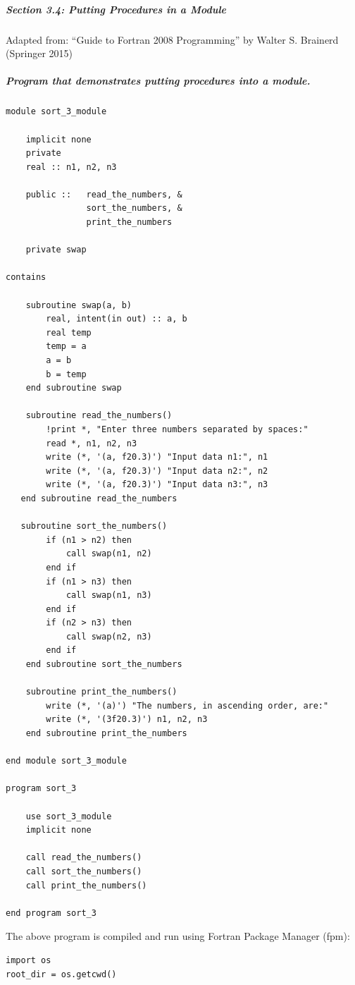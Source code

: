 \subparagraph{Section 3.4: Putting Procedures in a Module}

Adapted from: ``Guide to Fortran 2008 Programming'' by Walter S. Brainerd (Springer 2015)

\subparagraph{Program that demonstrates putting procedures into a module.}

\begin{verbatim}
module sort_3_module

    implicit none
    private
    real :: n1, n2, n3

    public ::   read_the_numbers, &
                sort_the_numbers, &
                print_the_numbers

    private swap

contains

    subroutine swap(a, b)
        real, intent(in out) :: a, b
        real temp
        temp = a
        a = b
        b = temp
    end subroutine swap

    subroutine read_the_numbers()
        !print *, "Enter three numbers separated by spaces:"
        read *, n1, n2, n3
        write (*, '(a, f20.3)') "Input data n1:", n1
        write (*, '(a, f20.3)') "Input data n2:", n2
        write (*, '(a, f20.3)') "Input data n3:", n3
   end subroutine read_the_numbers

   subroutine sort_the_numbers()
        if (n1 > n2) then
            call swap(n1, n2)
        end if
        if (n1 > n3) then
            call swap(n1, n3)
        end if
        if (n2 > n3) then
            call swap(n2, n3)
        end if
    end subroutine sort_the_numbers

    subroutine print_the_numbers()
        write (*, '(a)') "The numbers, in ascending order, are:"
        write (*, '(3f20.3)') n1, n2, n3
    end subroutine print_the_numbers

end module sort_3_module

program sort_3

    use sort_3_module
    implicit none

    call read_the_numbers()
    call sort_the_numbers()
    call print_the_numbers()

end program sort_3
\end{verbatim}

The above program is compiled and run using Fortran Package Manager (fpm):

\begin{verbatim}
import os
root_dir = os.getcwd()
\end{verbatim}

